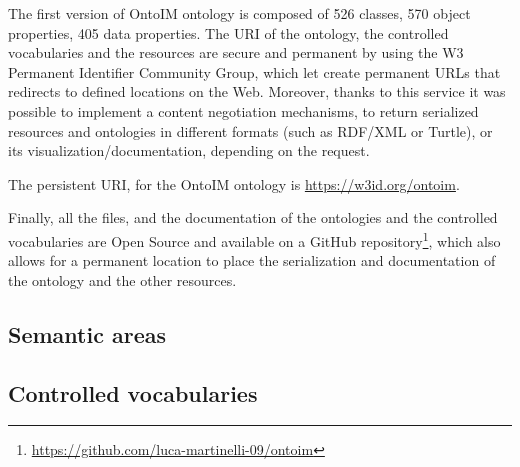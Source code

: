The first version of \ac{OntoIM} ontology is composed of 526 classes, 570 object properties, 405 data properties. The \ac{URI} of the ontology, the controlled vocabularies and the resources are secure and permanent by using the  W3 Permanent Identifier Community Group, which let create permanent \acp{URL} that redirects to defined locations on the Web. Moreover, thanks to this service it was possible to implement a content negotiation mechanisms, to return serialized resources and ontologies in different formats (such as \ac{RDF}/\ac{XML} or Turtle), or its visualization/documentation, depending on the request.

The persistent \ac{URI}, for the \ac{OntoIM} ontology is \url{https://w3id.org/ontoim}.

Finally, all the files, and the documentation of the ontologies and the controlled vocabularies are Open Source and available on a GitHub repository\footnote{\url{https://github.com/luca-martinelli-09/ontoim}}, which also allows for a permanent location to place the serialization and documentation of the ontology and the other resources.

\subsection{Semantic areas}
\label{subsec:semantic-areas}

\subsection{Controlled vocabularies}
\label{subsec:controlled-vocabularies}